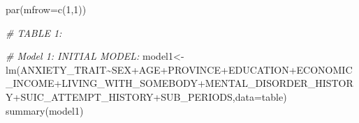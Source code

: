 \documentclass[
]{book}
\newenvironment{Shaded}{\begin{snugshade}}{\end{snugshade}}
\newcommand{\AttributeTok}[1]{\textcolor[rgb]{0.77,0.63,0.00}{#1}}
\newcommand{\CommentTok}[1]{\textcolor[rgb]{0.56,0.35,0.01}{\textit{#1}}}
\newcommand{\DecValTok}[1]{\textcolor[rgb]{0.00,0.00,0.81}{#1}}
\newcommand{\FunctionTok}[1]{\textcolor[rgb]{0.00,0.00,0.00}{#1}}
\newcommand{\NormalTok}[1]{#1}
\newcommand{\OtherTok}[1]{\textcolor[rgb]{0.56,0.35,0.01}{#1}}
\newcommand{\SpecialCharTok}[1]{\textcolor[rgb]{0.00,0.00,0.00}{#1}}
\begin{document}
\begin{Shaded}
\begin{Highlighting}[]
\FunctionTok{par}\NormalTok{(}\AttributeTok{mfrow=}\FunctionTok{c}\NormalTok{(}\DecValTok{1}\NormalTok{,}\DecValTok{1}\NormalTok{))}



\CommentTok{\# TABLE 1:}

\CommentTok{\# Model 1: INITIAL MODEL:}
\NormalTok{model1}\OtherTok{\textless{}{-}}\FunctionTok{lm}\NormalTok{(ANXIETY\_TRAIT}\SpecialCharTok{\textasciitilde{}}\NormalTok{SEX}\SpecialCharTok{+}\NormalTok{AGE}\SpecialCharTok{+}\NormalTok{PROVINCE}\SpecialCharTok{+}\NormalTok{EDUCATION}\SpecialCharTok{+}\NormalTok{ECONOMIC\_INCOME}\SpecialCharTok{+}\NormalTok{LIVING\_WITH\_SOMEBODY}\SpecialCharTok{+}\NormalTok{MENTAL\_DISORDER\_HISTORY}\SpecialCharTok{+}\NormalTok{SUIC\_ATTEMPT\_HISTORY}\SpecialCharTok{+}\NormalTok{SUB\_PERIODS,}\AttributeTok{data=}\NormalTok{table)}
\FunctionTok{summary}\NormalTok{(model1)}
\end{Highlighting}
\end{Shaded}
\end{document}
